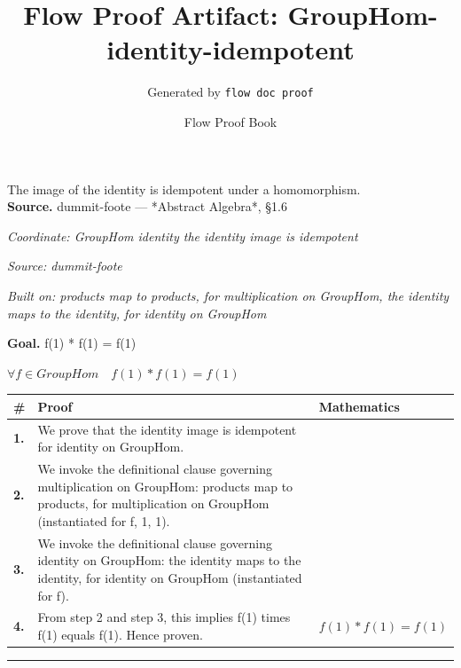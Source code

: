 \documentclass[11pt]{article}
\title{Flow Proof Artifact: GroupHom-identity-idempotent}
\author{Generated by \texttt{flow doc proof}}
\date{Flow Proof Book}
\theoremstyle{definition}
\begin{document}
\maketitle
The image of the identity is idempotent under a homomorphism.\\[0.5em]
\textbf{Source.} dummit-foote — *Abstract Algebra*, §1.6\\[0.5em]
\bigskip
{}\par
\smallskip\noindent\textit{Coordinate: GroupHom \cdot identity \cdot the identity image is idempotent}\par
\smallskip\noindent\textit{Source: dummit-foote}\par
\smallskip\noindent\textit{Built on: products map to products, for multiplication on GroupHom, the identity maps to the identity, for identity on GroupHom}\par
\medskip
\noindent\textbf{Goal.} f(1) * f(1) = f(1)\par
\noindent$\displaystyle \forall f \in GroupHom\quad f(1) * f(1) = f(1)$\par
\medskip
\noindent
\begin{tabular}{@{} >{\raggedright\arraybackslash}p{} >{\raggedright\arraybackslash}p{} >{\raggedleft\arraybackslash}p{} @{}}
\textbf{\#} & \textbf{Proof} & \textbf{Mathematics} \\
\midrule
\textbf{1.} & We prove that the identity image is idempotent for identity on GroupHom. & \\[0.45em]
\textbf{2.} & We invoke the definitional clause governing multiplication on GroupHom: products map to products, for multiplication on GroupHom (instantiated for f, 1, 1). & \\[0.45em]
\textbf{3.} & We invoke the definitional clause governing identity on GroupHom: the identity maps to the identity, for identity on GroupHom (instantiated for f). & \\[0.45em]
\textbf{4.} & From step 2 and step 3, this implies f(1) times f(1) equals f(1). Hence proven. & $\displaystyle f(1) * f(1) = f(1)$ \\[0.45em]
\bottomrule
\end{tabular}
\label{thm:GroupHom-identity-the_identity_image_is_idempotent}
\par\medskip\hrule
\end{document}
